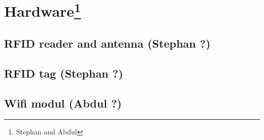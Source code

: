 \section[Hardware]{Hardware\footnote{Stephan and Abdul}}

\subsection{RFID reader and antenna (Stephan ?)}

\subsection{RFID tag (Stephan ?)}

\subsection{Wifi modul (Abdul ?)}